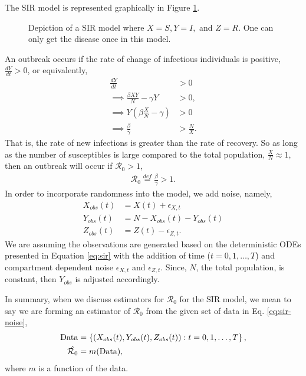 \documentclass[12pt]{article}
\newcommand{\rr}{\ensuremath{\mathcal{R}_0}}
\begin{document}
The SIR model is represented graphically in Figure \ref{fig::sir}. 
\begin{figure}[h]
\centering
{}
\caption{Depiction of a SIR model where $X=S, Y=I,$ and $Z=R$.  One can only get the disease once in this model.}\label{fig::sir}
\end{figure}
An outbreak occurs if the rate of change of infectious individuals is positive, $\frac{dY}{dt} > 0$, or equivalently,
\begin{align*}
  \frac{dY}{dt} &> 0 \\
  \implies \frac{\beta X Y}{N}  - \gamma Y &> 0 ,\\
\implies  Y \left ( \beta \frac{X}{N} - \gamma \right ) & > 0\\
\implies   \frac{\beta}{\gamma} &> \frac{N}{X}.
\end{align*}
That is,  the rate of new infections is greater than the rate of recovery.  So as long as the number of susceptibles is large compared to the total population, $\frac{X}{N} \approx 1$, then an outbreak will occur if $\rr >1$,
\begin{align*}
  \rr \overset{def}{=} \frac{\beta}{\gamma} > 1.
  \end{align*}
  In order to incorporate randomness into the model, we add noise, namely,
  \begin{align}\label{eq:sir-noise}
    X_{obs}(t) &= X(t) + \epsilon_{X,t}\\
    Y_{obs}(t) &=  N - X_{obs}(t) -Y_{obs}(t)  \nonumber\\
    Z_{obs}(t) &= Z(t) - \epsilon_{Z,t}. \nonumber
  \end{align}
We are assuming the observations are generated based on the deterministic ODEs presented in Equation \ref{eq:sir} with the addition of time ($t=0, 1, \dots, T$) and compartment dependent noise $\epsilon_{X,t}$ and $\epsilon_{Z,t}$.  Since, $N$, the total population, is constant, then $Y_{obs}$ is adjusted accordingly.

In summary, when we discuss estimators for $\rr$ for the SIR model, we mean to say we are forming an estimator of $\rr$ from the given set of data in Eq. \ref{eq:sir-noise},
\begin{align*}
  \textnormal{Data} &= \left \{\left (X_{obs}(t), Y_{obs}(t), Z_{obs}(t) \right ) : t=0, 1, \dots, T\right \}, \\
  \hat{\rr} &= m(\textnormal{Data}),
\end{align*}
where $m$ is a function of the data.
\end{document}
